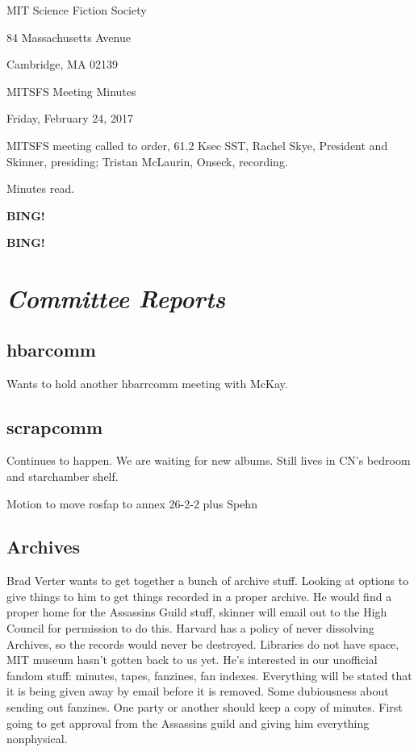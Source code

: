 \documentclass[10pt]{article}
\newcommand{\bing}{{\bf BING!} }
\newcommand{\goto}[1]{\bing \vskip 12pt \section*{{\em{#1}}}}
\newcommand{\ps}{ plus Spehn\xspace}
\newcommand{\skinner}{Rachel Skye, President and Skinner}
\newcommand{\onseck}{Tristan McLaurin, Onseck}
\newcommand{\meetingdate}{Friday, February 24, 2017}
\begin{document}
\begin{center}

MIT Science Fiction Society

84 Massachusetts Avenue

Cambridge, MA 02139

\vspace{12pt}

MITSFS Meeting Minutes

\meetingdate

\end{center}

\vspace{18pt}

\setlength{\parskip}{6pt}

\noindent
MITSFS meeting called to order, 61.2 Ksec SST,
\skinner, presiding; \onseck, recording.

Minutes read.

\bing

\goto{Committee Reports}
\subsection*{hbarcomm} 
Wants to hold another hbarrcomm meeting with McKay.

\subsection*{scrapcomm} 
Continues to happen. We are waiting for new albums. Still lives in CN's bedroom and starchamber shelf.

Motion to move rosfap to annex
26-2-2\ps

\subsection*{Archives}
Brad Verter wants to get together a bunch of archive stuff. Looking at options to give things to him to get things recorded in a proper archive. He would find a proper home for the Assassins Guild stuff, skinner will email out to the High Council for permission to do this. Harvard has a policy of never dissolving Archives, so the records would never be destroyed. Libraries do not have space, MIT museum hasn't gotten back to us yet. He's interested in our unofficial fandom stuff: minutes, tapes, fanzines, fan indexes. Everything will be stated that it is being given away by email before it is removed. Some dubiousness about sending out fanzines. One party or another should keep a copy of minutes.
First going to get approval from the Assassins guild and giving him everything nonphysical.
\end{document}
